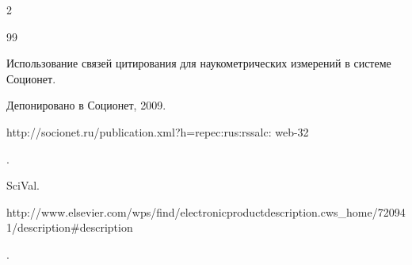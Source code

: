 \begin{multicols}{2}
{{\begin{thebibliography}{99}


Использование связей цитирования для наукометрических измерений в системе Соционет. 


Депонировано в Соционет, 2009. {\sf 


http://socionet.ru/publication.xml?h=repec:rus:rssalc: web-32}.





\label{end\stat}







SciVal.  {\sf 


http://www.elsevier.com/wps/find/electronic\linebreak productdescription.cws\_home/720941/description\linebreak \#description}.


 \end{thebibliography}


}


}








\end{multicols}


